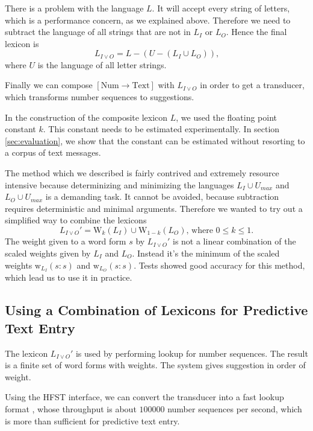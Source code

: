\documentclass[a4paper,conference]{IEEEtran}
\begin{document}
There is a problem with the language $L$. It will accept every
string of letters, which is a performance concern, as we explained
above. Therefore we need to subtract the language of all strings that
are not in $L_I$ or $L_O$. Hence the final lexicon is
\begin{equation}L_{I\vee O} = L - (U - (L_I \cup L_O))\text{,}\end{equation}
where $U$ is the language of all letter strings.

Finally we can compose $[\mathrm{Num}\rightarrow\mathrm{Text}]$ with
$L_{I\vee O}$ in order to get a transducer, which transforms number
sequences to suggestions.

In the construction of the composite lexicon $L$, we used the floating
point constant $k$. This constant needs to be estimated
experimentally. In section \ref{sec:evaluation}, we show that the
constant can be estimated without resorting to a corpus of text messages.

The method which we described is fairly contrived and extremely
resource intensive because determinizing and minimizing the languages
$L_I \cup U_{max}$ and $L_O \cup U_{max}$ is a demanding task. It
cannot be avoided, because subtraction requires deterministic and
minimal arguments. Therefore we wanted to try out a simplified way to
combine the lexicons
\begin{equation}
  L_{I\vee O}' = \mathrm{W}_k(L_I) \cup \mathrm{W}_{1-k}(L_O)\text{, where }0 \leq k \leq 1\text{.}
\end{equation} 
The weight given to a word form $s$ by $L_{I\vee O}'$ is not a linear
combination of the scaled weights given by $L_I$ and $L_O$. Instead
it's the minimum of the scaled weights
$\mathrm{w}_{L_I}(s\mathrm{:}s)$ and $\mathrm{w}_{L_O}(s\mathrm{:}s)$.
Tests showed good accuracy for this method, which lead us to use it in
practice.

\subsection{Using a Combination of Lexicons for Predictive Text Entry}

The lexicon $L_{I\vee O}'$ is used by performing lookup for number
sequences. The result is a finite set of word forms with weights. The
system gives suggestion in order of weight.

Using the HFST interface, we can convert the transducer into a fast
lookup format \cite{conf/fsmnlp/Silfverberg2009}, whose throughput is
about $100000$ number sequences per second, which is more than
sufficient for predictive text entry.
\end{document}
